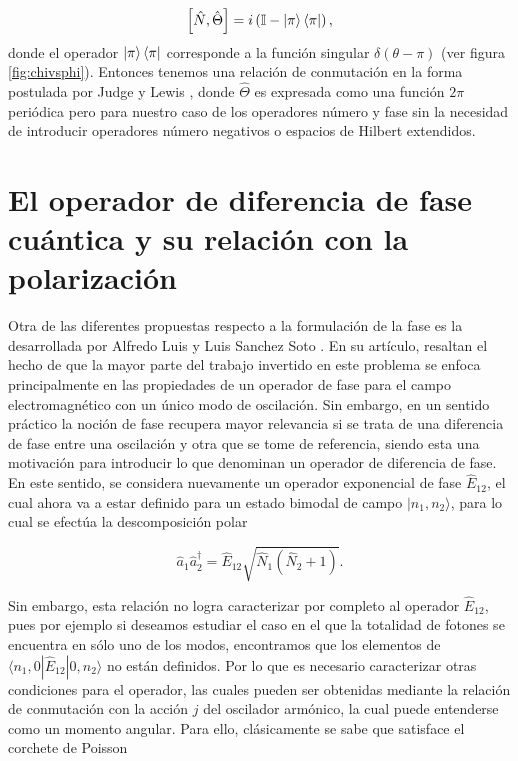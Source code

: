         \begin{equation}
            \left[ \hat{N},\hat{\Theta} \right] = i \left( \mathbb{I} - \ket{\pi}\bra{\pi} \right),
        \end{equation}
        donde el operador $\ket{\pi}\bra{\pi}$ corresponde a la función singular $\delta(\theta-\pi)$ (ver figura \ref{fig:chivsphi}). Entonces tenemos una relación de conmutación en la forma postulada por Judge y Lewis \cite{judge1963commutator}, donde $\hat{\Theta}$ es expresada como una función $2\pi$ periódica pero para nuestro caso de los operadores número y fase sin la necesidad de introducir operadores número negativos o espacios de Hilbert extendidos. 
\section{El operador de diferencia de fase cuántica y su relación con la polarización}

    Otra de las diferentes propuestas respecto a la formulación de la fase es la desarrollada por Alfredo Luis y Luis Sanchez Soto \cite{Diferencia-Fase}. En su artículo, resaltan el hecho de que la mayor parte del trabajo invertido en este problema se enfoca principalmente en las propiedades de un operador de fase para el campo electromagnético con un único modo de oscilación. Sin embargo, en un sentido práctico la noción de fase recupera mayor relevancia si se trata de una diferencia de fase entre una oscilación y otra que se tome de referencia, siendo esta una motivación para introducir lo que denominan un operador de diferencia de fase. \\ 
    
    
    En este sentido, se considera nuevamente un operador exponencial de fase $\hat{E}_{12}$, el cual ahora va a estar definido para un estado bimodal de campo $|n_1,n_2\rangle$, para lo cual se efectúa la descomposición polar 
    
    \begin{equation}
    \widehat{a}_{1}\widehat{a}^{\dagger}_2 = \hat{E}_{12}\sqrt{\hat{N}_1(\hat{N}_2 + 1)}.
    \end{equation}
    
    Sin embargo, esta relación no logra caracterizar por completo al operador $\hat{E}_{12}$, pues por ejemplo si deseamos estudiar el caso en el que la totalidad de fotones se encuentra en sólo uno de los modos, encontramos que los elementos de $\langle n_1,0| \hat{E}_{12} | 0,n_2\rangle$ no están definidos. Por lo que es necesario caracterizar otras condiciones para el operador, las cuales pueden ser obtenidas mediante la relación de conmutación con la acción $j$ del oscilador armónico, la cual puede entenderse como un momento angular. Para ello, clásicamente se sabe que satisface el corchete de Poisson
    
